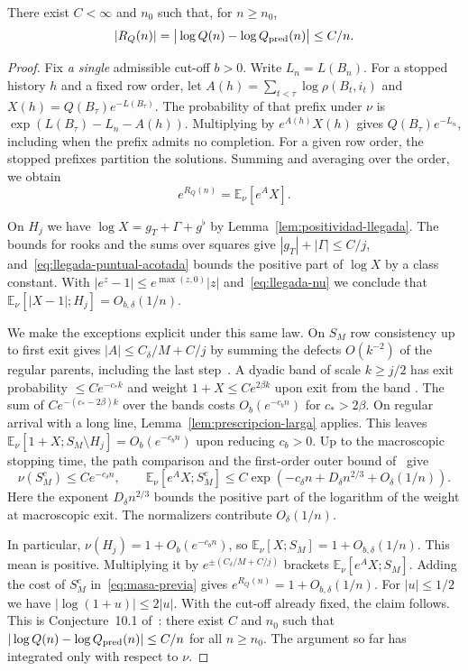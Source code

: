 \begin{lema}\label{lem:previa}
There exist \(C<\infty\) and \(n_0\) such that, for \(n\ge n_0\),
\[
 |R_Q(n)|=\big|\log Q(n)-\log Q_{\rm pred}(n)\big|\le C/n .
\]
\end{lema}
\begin{proof}
Fix \emph{a single} admissible cut-off \(b>0\). Write \(L_n=L(B_n)\). For a stopped history \(h\) and a
fixed row order, let \(A(h)=\sum_{t<\tau}\log\rho(B_t,i_t)\) and \(X(h)=Q(B_\tau)e^{-L(B_\tau)}\). The
probability of that prefix under \(\nu\) is \(\exp(L(B_\tau)-L_n-A(h))\). Multiplying by \(e^{A(h)}X(h)\)
gives \(Q(B_\tau)e^{-L_n}\), including when the prefix admits no completion. For a given row order, the
stopped prefixes partition the solutions. Summing and averaging over the order, we obtain
\begin{equation}\label{eq:masa-previa}
 e^{R_Q(n)}=\mathbb E_\nu[e^A X].
\end{equation}

On \(H_j\) we have \(\log X=g_T+\Gamma+g^\flat\) by Lemma~\ref{lem:positividad-llegada}. The bounds for
rooks and the sums over squares give \(|g_T|+|\Gamma|\le C/j\), and~\eqref{eq:llegada-puntual-acotada}
bounds the positive part of \(\log X\) by a class constant. With \(|e^z-1|\le e^{\max(z,0)}|z|\)
and~\eqref{eq:llegada-nu} we conclude that \(\mathbb E_\nu[|X-1|;H_j]=O_{b,\delta}(1/n)\).

We make the exceptions explicit under this same law. On \(S_M\) row consistency up to first exit gives
\(|A|\le C_\delta/M+C/j\) by summing the defects \(O(k^{-2})\) of the regular parents, including the last
step~\cite[Thms.~7.1 and 8.1]{pc}. A dyadic band of scale \(k\ge j/2\) has exit probability \(\le
Ce^{-c_*k}\) and weight \(1+X\le C e^{2\beta k}\) upon exit from the band \cite[§§5--6]{tc}. The sum of
\(Ce^{-(c_*-2\beta)k}\) over the bands costs \(O_b(e^{-c_b n})\) for \(c_*>2\beta\). On regular arrival
with a long line, Lemma~\ref{lem:prescripcion-larga} applies. This leaves \(\mathbb
E_\nu[1+X;S_M\setminus H_j]=O_b(e^{-c_b n})\) upon reducing \(c_b>0\). Up to the macroscopic stopping
time, the path comparison and the first-order outer bound of~\cite[Cor.~4.12 and §6]{tc} give
\[
 \nu(S_M^c)\le C e^{-c_\delta n},\qquad
 \mathbb E_\nu[e^A X;S_M^c]\le
 C\exp(-c_\delta n+D_\delta n^{2/3}+O_\delta(1/n)).
\]
Here the exponent \(D_\delta n^{2/3}\) bounds the positive part of the logarithm of the weight at
macroscopic exit. The normalizers contribute \(O_\delta(1/n)\).

In particular, \(\nu(H_j)=1+O_b(e^{-c_bn})\), so \(\mathbb E_\nu[X;S_M]=1+O_{b,\delta}(1/n)\). This mean
is positive. Multiplying it by \(e^{\pm(C_\delta/M+C/j)}\) brackets \(\mathbb E_\nu[e^AX;S_M]\). Adding
the cost of \(S_M^c\) in~\eqref{eq:masa-previa} gives \(e^{R_Q(n)}=1+O_{b,\delta}(1/n)\). For
\(|u|\le1/2\) we have \(|\log(1+u)|\le2|u|\). With the cut-off already fixed, the claim follows. This is
Conjecture~10.1 of~\cite{pc}: there exist \(C\) and \(n_0\) such that
\(|\log Q(n)-\log Q_{\rm pred}(n)|\le C/n\) for all \(n\ge n_0\). The argument so far has integrated only
with respect
to \(\nu\).
\end{proof}
